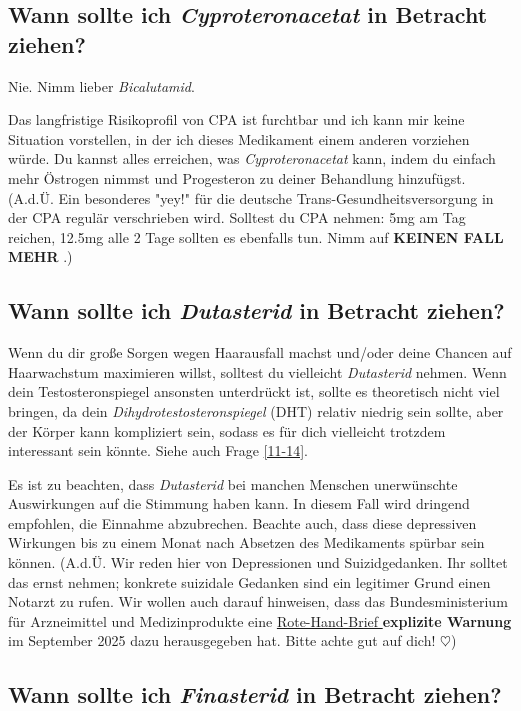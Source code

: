 \documentclass{article}
\begin{document}
\subsection{Wann sollte ich \textit{Cyproteronacetat} in Betracht ziehen?}

Nie. Nimm lieber \textit{Bicalutamid}.

Das langfristige Risikoprofil von CPA ist furchtbar und ich kann mir keine Situation vorstellen, in der ich dieses Medikament einem anderen vorziehen würde. Du kannst alles erreichen, was \textit{Cyproteronacetat} kann, indem du einfach mehr Östrogen nimmst und Progesteron zu deiner Behandlung hinzufügst. (A.d.Ü. Ein besonderes "yey!" für die deutsche Trans-Gesundheitsversorgung in der CPA regulär verschrieben wird. Solltest du CPA nehmen: 5mg am Tag reichen, 12.5mg alle 2 Tage sollten es ebenfalls tun. Nimm auf \textbf{KEINEN FALL MEHR }.)

\subsection{Wann sollte ich \textit{Dutasterid} in Betracht ziehen?}

Wenn du dir große Sorgen wegen Haarausfall machst und/oder deine Chancen auf Haarwachstum maximieren willst, solltest du vielleicht \textit{Dutasterid} nehmen. Wenn dein Testosteronspiegel ansonsten unterdrückt ist, sollte es theoretisch nicht viel bringen, da dein \textit{Dihydrotestosteronspiegel} (DHT) relativ niedrig sein sollte, aber der Körper kann kompliziert sein, sodass es für dich vielleicht trotzdem interessant sein könnte. Siehe auch Frage \ref{11-14}.

Es ist zu beachten, dass \textit{Dutasterid} bei manchen Menschen unerwünschte Auswirkungen auf die Stimmung haben kann. In diesem Fall wird dringend empfohlen, die Einnahme abzubrechen. Beachte auch, dass diese depressiven Wirkungen bis zu einem Monat nach Absetzen des Medikaments spürbar sein können. (A.d.Ü. Wir reden hier von Depressionen und Suizidgedanken. Ihr solltet das ernst nehmen; konkrete suizidale Gedanken sind ein legitimer Grund einen Notarzt zu rufen. Wir wollen auch darauf hinweisen, dass das Bundesministerium für Arzneimittel und Medizinprodukte eine \href{https://www.bfarm.de/SharedDocs/Risikoinformationen/Pharmakovigilanz/DE/RHB/2025/rhb-finasterid.pdf}{Rote-Hand-Brief }\textbf{explizite Warnung} im September 2025 dazu herausgegeben hat. Bitte achte gut auf dich! $\heartsuit$)

\subsection{Wann sollte ich \textit{Finasterid} in Betracht ziehen?}
\end{document}
